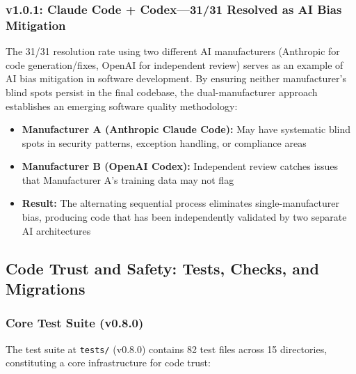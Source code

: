 \documentclass[10pt]{article}
\begin{document}
\subsubsection{v1.0.1: Claude Code + Codex---31/31 Resolved as AI Bias Mitigation}

The 31/31 resolution rate using two different AI manufacturers (Anthropic for code generation/fixes, OpenAI for independent review) serves as an example of AI bias mitigation in software development. By ensuring neither manufacturer's blind spots persist in the final codebase, the dual-manufacturer approach establishes an emerging software quality methodology:
\begin{itemize}
  \item \textbf{Manufacturer A (Anthropic Claude Code):} May have systematic blind spots in security patterns, exception handling, or compliance areas
  \item \textbf{Manufacturer B (OpenAI Codex):} Independent review catches issues that Manufacturer A's training data may not flag
  \item \textbf{Result:} The alternating sequential process eliminates single-manufacturer bias, producing code that has been independently validated by two separate AI architectures
\end{itemize}

\subsection{Code Trust and Safety: Tests, Checks, and Migrations}
\label{sec:codetrust}

\subsubsection{Core Test Suite (v0.8.0)}

The test suite at \texttt{tests/} (v0.8.0) contains 82 test files across 15 directories, constituting a core infrastructure for code trust:
\end{document}
